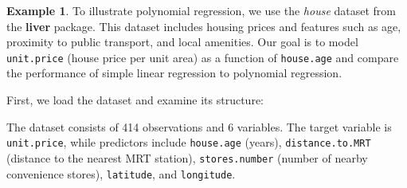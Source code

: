 \documentclass[
  11pt,
]{book}
\makeatletter
\newenvironment{Shaded}{}{}
\newcommand{\DecValTok}[1]{#1}
\newcommand{\ErrorTok}[1]{\textcolor[rgb]{0.21,0.21,0.21}{\textbf{#1}}}
\newcommand{\FloatTok}[1]{#1}
\newcommand{\FunctionTok}[1]{#1}
\newcommand{\NormalTok}[1]{#1}
\newcommand{\SpecialCharTok}[1]{\textcolor[rgb]{0.39,0.39,0.39}{#1}}
\newcommand{\StringTok}[1]{\textcolor[rgb]{0.39,0.39,0.39}{#1}}
\newenvironment{kframe}{%
\medskip{}
\setlength{\fboxsep}{.8em}
 \def\at@end@of@kframe{}%
 \ifinner\ifhmode%
  \def\at@end@of@kframe{\end{minipage}}%
  \begin{minipage}{\columnwidth}%
 \fi\fi%
 \def\FrameCommand##1{\hskip\@totalleftmargin \hskip-\fboxsep
 \colorbox{shadecolor}{##1}\hskip-\fboxsep
     \hskip-\linewidth \hskip-\@totalleftmargin \hskip\columnwidth}%
 \MakeFramed {\advance\hsize-\width
   \@totalleftmargin\z@ \linewidth\hsize
   \@setminipage}}%
 {\par\unskip\endMakeFramed%
 \at@end@of@kframe}
\renewenvironment{Shaded}{\begin{kframe}}{\end{kframe}}
\theoremstyle{definition}
\theoremstyle{definition}
\newtheorem{example}{Example}[chapter]
\theoremstyle{definition}
\theoremstyle{definition}
\theoremstyle{remark}
\makeatother
\begin{document}
\begin{example}
\protect\hypertarget{exm:ex-polynomial-regression}{}\label{exm:ex-polynomial-regression}To illustrate polynomial regression, we use the \emph{house} dataset from the \textbf{liver} package. This dataset includes housing prices and features such as age, proximity to public transport, and local amenities. Our goal is to model \texttt{unit.price} (house price per unit area) as a function of \texttt{house.age} and compare the performance of simple linear regression to polynomial regression.

First, we load the dataset and examine its structure:

\begin{Shaded}
\end{Shaded}

The dataset consists of 414 observations and 6 variables. The target variable is \texttt{unit.price}, while predictors include \texttt{house.age} (years), \texttt{distance.to.MRT} (distance to the nearest MRT station), \texttt{stores.number} (number of nearby convenience stores), \texttt{latitude}, and \texttt{longitude}.


\end{example}
\end{document}
